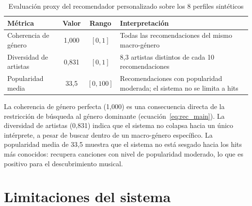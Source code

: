\documentclass[12pt, a4paper]{book}
\theoremstyle{definition}
\begin{document}
\begin{table}[H]
\centering
\caption{Evaluación proxy del recomendador personalizado sobre los 8 perfiles sintéticos}
\label{tab:eval_proxy}
\small
\begin{tabular}{lccp{5cm}}
\toprule
\textbf{Métrica} & \textbf{Valor} & \textbf{Rango} & \textbf{Interpretación} \\
\midrule
Coherencia de género   & 1{,}000 & $[0,1]$ &
  Todas las recomendaciones del mismo macro-género \\
Diversidad de artistas & 0{,}831 & $[0,1]$ &
  8{,}3 artistas distintos de cada 10 recomendaciones \\
Popularidad media      & 33{,}5  & $[0, 100]$ &
  Recomendaciones con popularidad moderada; el sistema no se limita a hits \\
\bottomrule
\end{tabular}
\end{table}

La coherencia de género perfecta (1{,}000) es una consecuencia directa de la
restricción de búsqueda al género dominante (ecuación~\ref{eq:rec_main}).
La diversidad de artistas (0{,}831) indica que el sistema no colapsa hacia
un único intérprete, a pesar de buscar dentro de un macro-género específico.
La popularidad media de 33{,}5 muestra que el sistema no está sesgado hacia
los hits más conocidos: recupera canciones con nivel de popularidad moderado,
lo que es positivo para el descubrimiento musical.

\section{Limitaciones del sistema}
\label{sec:limitaciones_rec}
\end{document}
